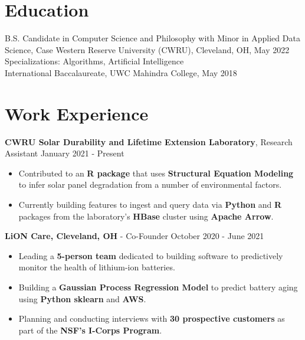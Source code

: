 \documentclass{res}
\begin{document}
 
 
 
\address{ 216-303-2983 \\  rounak@case.edu}
\address{\hfill github.com/theroshogolla \\ \hfill linkedin.com/in/rounakchawla/}
 
\begin{resume} 
 
\section{Education} 
B.S. Candidate in Computer Science and Philosophy with Minor in Applied Data Science, Case Western Reserve University (CWRU), Cleveland, OH, May 2022 \\
Specializations: Algorithms, Artificial Intelligence \\
International Baccalaureate, UWC Mahindra College, May 2018

\section{Work Experience}
{\bf CWRU Solar Durability and Lifetime Extension Laboratory}, Research Assistant \hfill January 2021 - Present
\begin{itemize} \itemsep -2pt
	\item Contributed to an \textbf{R package} that uses \textbf{Structural Equation Modeling} to infer solar panel degradation from a number of environmental factors.
	\item Currently building features to ingest and query data via \textbf{Python} and \textbf{R} packages from the laboratory's \textbf{HBase} cluster using \textbf{Apache Arrow}.
\end{itemize}
{\bf LiON Care, Cleveland, OH} - Co-Founder \hfill October 2020 - June 2021
\begin{itemize} \itemsep -2pt
	\item Leading a \textbf{5-person team} dedicated to building software to predictively monitor the health of lithium-ion batteries.
	\item Building a \textbf{Gaussian Process Regression Model} to predict battery aging using \textbf{Python sklearn} and \textbf{AWS}.
	\item Planning and conducting interviews with \textbf{30 prospective customers} as part of the \textbf{NSF's I-Corps Program}.
	

\end{itemize}
\end{resume}
\end{document}
